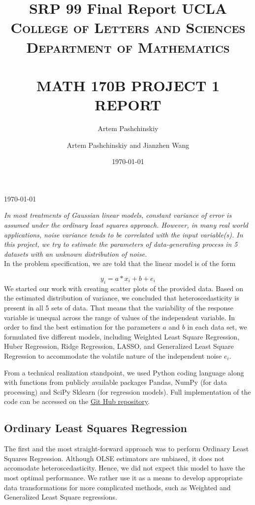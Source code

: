 \documentclass[letter,12pt]{article} %
\author{Artem Pashchinskiy}
\title{SRP 99 Final Report}
\date{\today}
\title{ \normalsize \textsc{UCLA College of Letters and Sciences \\ Department of Mathematics}  %
	\\[2.0cm]                                                   %
	\HRule{0.5pt} \\                                        %
	\LARGE \textbf{\uppercase{Math 170B Project 1 Report}}   %
	\HRule{2pt} \\ [0.5cm]                              %
	\printauthor                                    %
}
\author{
	Artem Pashchinskiy and Jianzhen Wang
}
\makeatletter
\def\printtitle{%
	{\centering \@title\par}}
\makeatother
\begin{document}
	\thispagestyle{empty}               %
	
	\printtitle                                 %
	\vfill
	\begin{center} \today \end{center}
	
	\newpage
	
	\textit{In most treatments of Gaussian linear models, constant variance of error is assumed under the ordinary least squares approach. However, in many real world applications, noise variance tends to be correlated with the input variable(s). In this project, we try to estimate the parameters of data-generating process in 5 datasets with an unknown distribution of noise. }\\
	
	In the problem specification, we are told that the linear model is of the form 
	
	$$y_i = a*x_i + b + e_i$$
	We started our work with creating scatter plots of the provided data. Based on the estimated distribution of variance,  we concluded that  heteroscedasticity is present in all 5 sets of data. That means that the variability of the response variable is unequal across the range of values of the independent variable. In order to find the best estimation for the parameters $a$ and $b$ in each data set, we formulated five different models, including Weighted Least Square Regression, Huber Regression, Ridge Regression, LASSO, and Generalized Least Square Regression to accommodate the volatile nature of the independent noise $e_i$.
	
	From a technical realization standpoint, we used Python coding language along with functions from publicly available packages Pandas, NumPy (for data processing) and SciPy Sklearn (for regression models). Full implementation of the code can be accessed on the \href{https://github.com/apashch/Heterosked-reg-models}{\underline{Git Hub repository}}.
	
	\subsection*{Ordinary Least Squares Regression}
	The first and the most straight-forward approach was to perform Ordinary Least Squares Regression. Although OLSE estimators are unbiased, it does not accomodate heteroscedasticity. Hence, we did not expect this model to have the most optimal performance. We rather use it as a means to develop appropriate data transformations for more complicated methods, such as Weighted and Generalized Least Square regressions.
	
\end{document}
